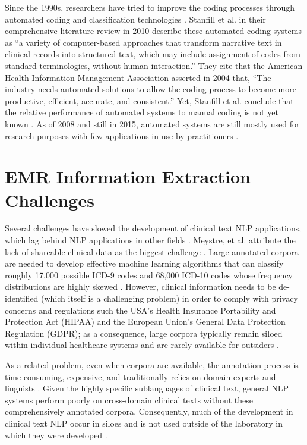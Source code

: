 \documentclass[sigconf]{acmart}
\begin{document}
Since the 1990s, researchers have tried to improve the coding processes through automated coding and classification technologies \cite{kavuluru2013unsupervised}. Stanfill et al. in their comprehensive literature review in 2010 describe these automated coding systems as ``a variety of computer-based approaches that transform narrative text in clinical records into structured text, which may include assignment of codes from standard terminologies, without human interaction.'' They cite that the American Health Information Management Association asserted in 2004 that, ``The industry needs automated solutions to allow the coding process to become more productive, efficient, accurate, and consistent.'' Yet, Stanfill et al. conclude that the relative performance of automated systems to manual coding is not yet known \cite{stanfill2010systematic}. As of 2008 and still in 2015, automated systems are still mostly used for research purposes with few applications in use by practitioners \cite{meystre2008extracting} \cite{velupillai2015recent}. 



\section{EMR Information Extraction Challenges}
Several challenges have slowed the development of clinical text NLP applications, which lag behind NLP applications in other fields \cite{chapman2011overcoming}. Meystre, et al. attribute the lack of shareable clinical data as the biggest challenge \cite{meystre2008extracting}. Large annotated corpora are needed to develop effective machine learning algorithms that can classify roughly 17,000 possible ICD-9 codes and 68,000 ICD-10 codes whose frequency distributions are highly skewed \cite{berndorfer2017automated}. However, clinical information needs to be de-identified (which itself is a challenging problem) in order to comply with privacy concerns and regulations such the USA's Health Insurance Portability and Protection Act (HIPAA) and the European Union's General Data Protection Regulation (GDPR); as a consequence, large corpora typically remain siloed within individual healthcare systems and are rarely available for outsiders \cite{meystre2008extracting} \cite{stanfill2010systematic}.

As a related problem, even when corpora are available, the annotation process is time-consuming, expensive, and traditionally relies on domain experts and linguists \cite{meystre2008extracting} \cite{velupillai2015recent}. Given the highly specific sublanguages of clinical text, general NLP systems perform poorly on cross-domain clinical texts without these comprehensively annotated corpora. Consequently, much of the development in clinical text NLP occur in siloes and is not used outside of the laboratory in which they were developed \cite{chapman2011overcoming}.
\end{document}
